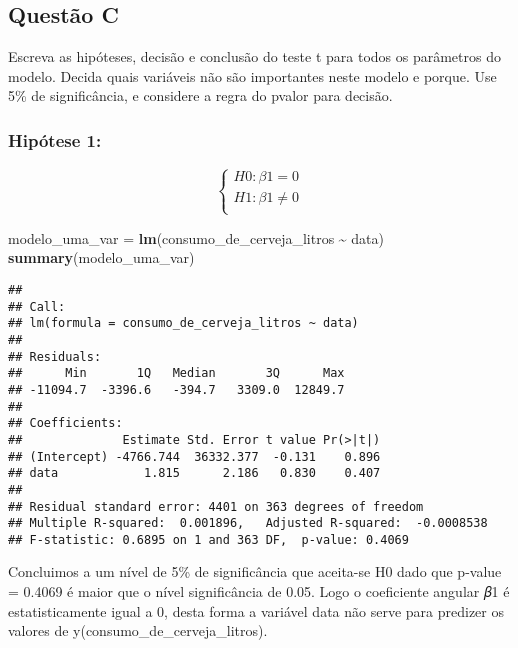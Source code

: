 \documentclass[
]{article}
\newenvironment{Shaded}{\begin{snugshade}}{\end{snugshade}}
\newcommand{\FunctionTok}[1]{\textcolor[rgb]{0.13,0.29,0.53}{\textbf{#1}}}
\newcommand{\NormalTok}[1]{#1}
\newcommand{\OtherTok}[1]{\textcolor[rgb]{0.56,0.35,0.01}{#1}}
\newcommand{\SpecialCharTok}[1]{\textcolor[rgb]{0.81,0.36,0.00}{\textbf{#1}}}
\begin{document}
\hypertarget{questuxe3o-c}{%
\subsection{Questão C}\label{questuxe3o-c}}

Escreva as hipóteses, decisão e conclusão do teste t para todos os
parâmetros do modelo. Decida quais variáveis não são importantes neste
modelo e porque. Use 5\% de significância, e considere a regra do pvalor
para decisão.

\hypertarget{hipuxf3tese-1}{%
\subsubsection{Hipótese 1:}\label{hipuxf3tese-1}}

\[
\left\{ \begin{array}{rc} 
H0: \beta1 = 0 \\ 
H1: \beta1 \neq 0 \\ 
\end{array}\right.
\]

\begin{Shaded}
\begin{Highlighting}[]
\NormalTok{modelo\_uma\_var }\OtherTok{=} \FunctionTok{lm}\NormalTok{(consumo\_de\_cerveja\_litros }\SpecialCharTok{\textasciitilde{}}\NormalTok{ data)}
\FunctionTok{summary}\NormalTok{(modelo\_uma\_var)}
\end{Highlighting}
\end{Shaded}

\begin{verbatim}
## 
## Call:
## lm(formula = consumo_de_cerveja_litros ~ data)
## 
## Residuals:
##      Min       1Q   Median       3Q      Max 
## -11094.7  -3396.6   -394.7   3309.0  12849.7 
## 
## Coefficients:
##              Estimate Std. Error t value Pr(>|t|)
## (Intercept) -4766.744  36332.377  -0.131    0.896
## data            1.815      2.186   0.830    0.407
## 
## Residual standard error: 4401 on 363 degrees of freedom
## Multiple R-squared:  0.001896,   Adjusted R-squared:  -0.0008538 
## F-statistic: 0.6895 on 1 and 363 DF,  p-value: 0.4069
\end{verbatim}

Concluimos a um nível de 5\% de significância que aceita-se H0 dado que
p-value = 0.4069 é maior que o nível significância de 0.05. Logo o
coeficiente angular 𝛽1 é estatisticamente igual a 0, desta forma a
variável data não serve para predizer os valores de
y(consumo\_de\_cerveja\_litros).
\end{document}
